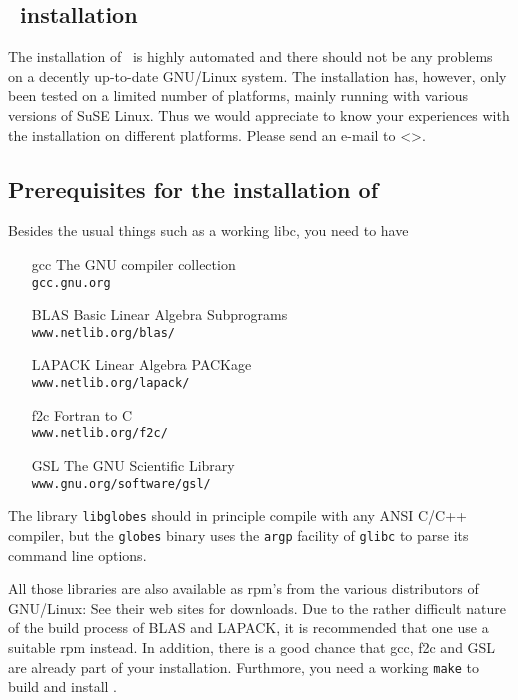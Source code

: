 
\begin{appendix}

\chapter{\GLOBES\ installation}
\label{app:installation}


The installation of \GLOBES\ is highly automated and there should not be
any problems on a decently up-to-date GNU/Linux system. The installation
has, however, only been tested on a limited number of platforms, mainly
running with various versions of SuSE Linux. Thus we would appreciate
to know your experiences with the installation on different platforms.
Please send an e-mail to <\bugs>.

\section*{Prerequisites for the installation of \GLOBES}

Besides the usual things such as a working libc, you need to have
\begin{itemize}
\item[gcc] The GNU compiler collection\\
\verb+gcc.gnu.org+
\item[BLAS] Basic Linear Algebra Subprograms\\
\verb+www.netlib.org/blas/+    
\item[LAPACK] Linear Algebra PACKage\\
\verb+www.netlib.org/lapack/+
\item[f2c] Fortran to C\\ 
\verb+www.netlib.org/f2c/+
\item[GSL] The GNU Scientific Library\\
\verb+www.gnu.org/software/gsl/+
\end{itemize}
The library \verb+libglobes+ should in principle compile with any
ANSI C/C++ compiler, but the \verb+globes+ binary uses the 
\verb+argp+ facility of \verb+glibc+ to parse its command line options.

All those libraries are also available as rpm's from the various
distributors of GNU/Linux: See their web sites for downloads. Due to
the rather difficult nature of the build process of BLAS and LAPACK,
it is recommended that one use a suitable rpm instead. In addition,
there is a good chance that
gcc, f2c and GSL are already part of your installation. Furthmore, you need
a working \verb+make+ to build and install \GLOBES.


\end{appendix}
